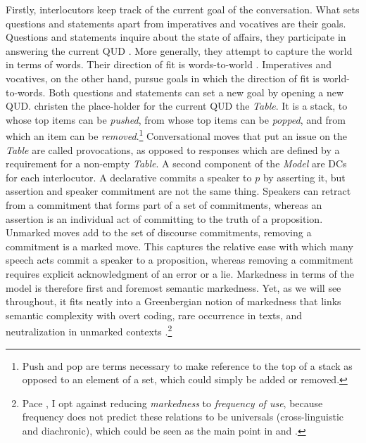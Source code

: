 Firstly, interlocutors keep track of the current goal of the conversation. What sets questions and statements apart from imperatives and vocatives are their goals. Questions and statements inquire about the state of affairs, they participate in answering the current \ac{QUD} \citep{Roberts.2012,BeaverRobertsSimonsTonhauser.2017}. More generally, they attempt to capture the world in terms of words. Their direction of fit is words-to-world \citep{Searle1979}. Imperatives and vocatives, on the other hand, pursue goals in which the direction of fit is world-to-words. Both questions and statements can set a new goal by opening a new 
\ac{QUD}. \citet[86]{FarkasBruce.2010} christen the place-holder for the current
\ac{QUD} the \textit{Table}. It is a stack, to whose top items can be 
\textit{pushed}, from whose top items can be \textit{popped}, and from 
which an item can be \textit{removed}.\footnote{Push and pop are terms 
necessary to make reference to the top of a stack as opposed to an element 
of a set, which could simply be added or removed.} Conversational moves that put an issue on the \textit{Table} are called provocations, as opposed to responses which are defined by a requirement for a non-empty \textit{Table}. A second component of the \textit{\citeauthor{FarkasBruce.2010} Model} are \acp{DC} for each interlocutor. A declarative commits a speaker to $p$ by asserting it, but assertion and speaker commitment are not the same thing. Speakers can retract from a commitment that forms part of a set of commitments, whereas an assertion is an individual act of committing to the truth of a proposition. Unmarked moves add to the set of discourse commitments, removing a commitment is a marked move. This captures the relative ease with which many speech acts commit a speaker to a proposition, whereas removing a commitment requires explicit acknowledgment of an error or a lie. Markedness in terms of the model is therefore first and foremost semantic markedness. Yet, as we will see throughout, it fits neatly into a Greenbergian notion of markedness that links semantic complexity with overt coding, rare occurrence in texts, and neutralization in unmarked contexts \citep{Greenberg.1966}.\footnote{Pace \citet{Haspelmath.2006againstmarkedness}, I opt against reducing \textit{markedness} to \textit{frequency of use}, because frequency does not predict these relations to be universals (cross-linguistic and diachronic), which could be seen as the main point in \citet{Greenberg.1966} and \citet{FarkasBruce.2010}.}

